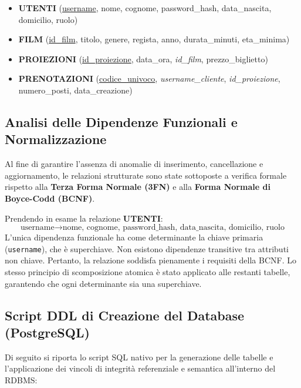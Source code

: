 \documentclass[12pt, a4paper]{article}
\begin{document}
\begin{itemize}
    \item \textbf{UTENTI} (\underline{username}, nome, cognome, password\_hash, data\_nascita, domicilio, ruolo)
    \item \textbf{FILM} (\underline{id\_film}, titolo, genere, regista, anno, durata\_minuti, eta\_minima)
    \item \textbf{PROIEZIONI} (\underline{id\_proiezione}, data\_ora, \textit{id\_film}, prezzo\_biglietto)
    \item \textbf{PRENOTAZIONI} (\underline{codice\_univoco}, \textit{username\_cliente}, \textit{id\_proiezione}, numero\_posti, data\_creazione)
\end{itemize}

\subsection{Analisi delle Dipendenze Funzionali e Normalizzazione}
Al fine di garantire l'assenza di anomalie di inserimento, cancellazione e aggiornamento, le relazioni strutturate sono state sottoposte a verifica formale rispetto alla \textbf{Terza Forma Normale (3FN)} e alla \textbf{Forma Normale di Boyce-Codd (BCNF)}.

Prendendo in esame la relazione \textbf{UTENTI}:
\begin{equation*}
    \text{username} \rightarrow \text{nome, cognome, password\_hash, data\_nascita, domicilio, ruolo}
\end{equation*}
L'unica dipendenza funzionale ha come determinante la chiave primaria (\texttt{username}), che è superchiave. Non esistono dipendenze transitive tra attributi non chiave. Pertanto, la relazione soddisfa pienamente i requisiti della BCNF. Lo stesso principio di scomposizione atomica è stato applicato alle restanti tabelle, garantendo che ogni determinante sia una superchiave.

\subsection{Script DDL di Creazione del Database (PostgreSQL)}
Di seguito si riporta lo script SQL nativo per la generazione delle tabelle e l'applicazione dei vincoli di integrità referenziale e semantica all'interno del RDBMS:
\end{document}
